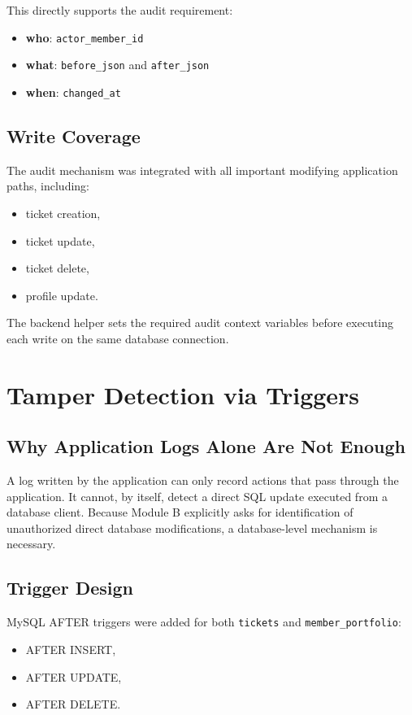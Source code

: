 \documentclass[12pt,a4paper]{article}
\begin{document}
This directly supports the audit requirement:
\begin{itemize}[leftmargin=1.5em]
    \item \textbf{who}: \texttt{actor\_member\_id}
    \item \textbf{what}: \texttt{before\_json} and \texttt{after\_json}
    \item \textbf{when}: \texttt{changed\_at}
\end{itemize}

\subsection{Write Coverage}
The audit mechanism was integrated with all important modifying application paths, including:
\begin{itemize}[leftmargin=1.5em]
    \item ticket creation,
    \item ticket update,
    \item ticket delete,
    \item profile update.
\end{itemize}

The backend helper sets the required audit context variables before executing each write on the same database connection.

\section{Tamper Detection via Triggers}
\subsection{Why Application Logs Alone Are Not Enough}
A log written by the application can only record actions that pass through the application. It cannot, by itself, detect a direct SQL update executed from a database client. Because Module B explicitly asks for identification of unauthorized direct database modifications, a database-level mechanism is necessary.

\subsection{Trigger Design}
MySQL AFTER triggers were added for both \texttt{tickets} and \texttt{member\_portfolio}:
\begin{itemize}[leftmargin=1.5em]
    \item AFTER INSERT,
    \item AFTER UPDATE,
    \item AFTER DELETE.
\end{itemize}
\end{document}
